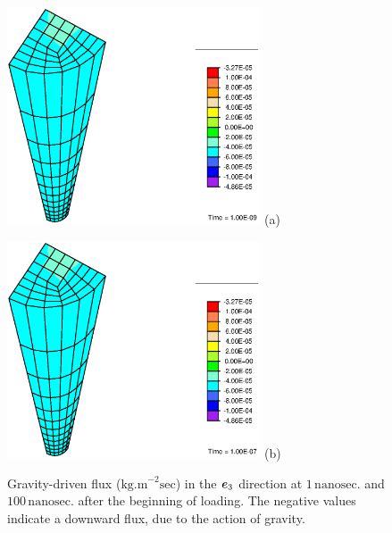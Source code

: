 \begin{figure}[!hpt]
\begin{minipage}[t]{7.5cm}
{\includegraphics[width=7.5cm]{images/examples/lagrangian/preliminary/M3-1}} \hskip 3cm (a)
\end{minipage}
\begin{minipage}[t]{7.5cm}
{\includegraphics[width=7.5cm]{images/examples/lagrangian/preliminary/M3-100}} \hskip 3cm (b)
\end{minipage}
\caption{Gravity-driven flux ($\mathrm{kg.m}^{-2}\mathrm{sec}$) in
the $\mbox{\boldmath$ e$}_3$ direction at $1 \,\mathrm{nanosec.}$ and
$100\,\mathrm{nanosec.}$ after the beginning of loading. The
negative values indicate a downward flux, due to the action of
gravity.} \label{M3fig}
\end{figure}

